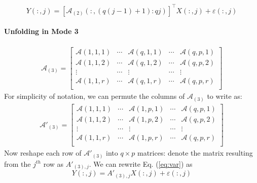 \begin{equation}
Y(:, j) = [\mathcal{A}_{(2)}(:, (q(j-1)+1):qj)]^{\top}X(:, j) + \varepsilon(:, j)
\end{equation}

\paragraph{Unfolding in Mode 3}
\begin{align*}
\mathcal{A}_{(3)}= \left[ \begin{array}{ccccc}
\mathcal{A}(1, 1, 1) & \cdots & \mathcal{A}(q, 1, 1) & \cdots &\mathcal{A}(q, p, 1)\\
\mathcal{A}(1, 1, 2) & \cdots & \mathcal{A}(q, 1, 2) & \cdots &\mathcal{A}(q, p, 2)\\
\vdots & \cdots& \vdots&\cdots&\vdots\\
\mathcal{A}(1, 1, r) & \cdots & \mathcal{A}(q, 1, r) & \cdots &\mathcal{A}(q, p, r)\\ \end{array} \right]
\end{align*}
For simplicity of notation, we can permute the columns of $\mathcal{A}_{(3)}$ to write as: 
\begin{align*}
\mathcal{A}'_{(3)}= \left[ \begin{array}{ccccc}
\mathcal{A}(1, 1, 1) & \cdots & \mathcal{A}(1, p, 1) & \cdots &\mathcal{A}(q, p, 1)\\
\mathcal{A}(1, 1, 2) & \cdots & \mathcal{A}(1, p, 2) & \cdots &\mathcal{A}(q, p, 2)\\
\vdots & \cdots& \vdots&\cdots&\vdots\\
\mathcal{A}(1, 1, r) & \cdots & \mathcal{A}(1, p, r) & \cdots &\mathcal{A}(q, p, r)\\ \end{array} \right]
\end{align*}
Now reshape each row of $\mathcal{A}'_{(3)}$ into $q\times p$ matrices: denote the matrix resulting from the $j^{th}$ row as $A'_{(3), j}$. We can rewrite Eq. (\ref{eq:var}) as
\begin{equation}
Y(:, j) = A'_{(3), j}X(:, j) + \varepsilon(:, j)
\end{equation}
